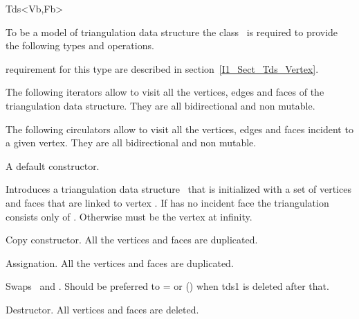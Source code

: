 \begin{ccClassTemplate}{Tds<Vb,Fb>}

To be a model of  triangulation data structure 
the class \ccClassTemplateName\
is required to  provide the
following types and operations.

\ccGlue
{}
\ccThreeToTwo
{}
\ccGlue
{}
\ccGlue
{} { requirement for this type are described in  section~\ref{I1_Sect_Tds_Vertex}.}
\ccGlue
{}

The following iterators allow to visit all the vertices, edges and faces
of the triangulation data structure. They are all bidirectional and non mutable.

\ccGlue
{}
\ccGlue
{}

The following circulators allow to visit all the vertices, edges and faces
incident to a given vertex. They are all bidirectional and non mutable.

\ccGlue
{}
\ccGlue
{}
  
\ccCreation
{}
{A default constructor.}

{Introduces a triangulation data structure \ccVar\ that is initialized with a
set of 
vertices and faces that are linked to vertex . If 
has no incident face the triangulation consists only of \ccc{v}.
Otherwise \ccc{v} must be the vertex at infinity.}

{Copy constructor. All the vertices and faces are duplicated.}

{Assignation. All the vertices and faces are duplicated.}

{Swaps \ccVar\ and . Should be preferred to \ccVar= or \ccVar()
when tds1 is deleted after that.}

{Destructor. All vertices and faces are deleted.}


\end{ccClassTemplate}
